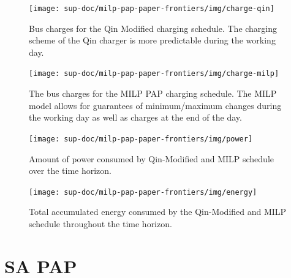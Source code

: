 \documentclass[ee,thesis]{usuthesis}
\begin{document}
\begin{subfigures}
    \begin{figure}[htpb]
    \centering
        \texttt{[image: sup-doc/milp-pap-paper-frontiers/img/charge-qin]}
        \caption{Bus charges for the Qin Modified charging schedule. The charging scheme of the Qin charger is more predictable during the working day.}
        \label{subfig:qin-charge}
    \end{figure}

    \hfill

    \begin{figure}[htpb]
    \centering
        \texttt{[image: sup-doc/milp-pap-paper-frontiers/img/charge-milp]}
        \caption{The bus charges for the MILP PAP charging schedule. The MILP model allows for guarantees of minimum/maximum changes during the working day as well as charges at the end of the day.}
        \label{subfig:milp-charge}
    \end{figure}
\end{subfigures}

\begin{figure}[htpb]
\centering
    \texttt{[image: sup-doc/milp-pap-paper-frontiers/img/power]}
    \caption{Amount of power consumed by Qin-Modified and MILP schedule over the time horizon.}
    \label{fig:power-usage}
\end{figure}

\begin{figure}[htpb]
\centering
    \texttt{[image: sup-doc/milp-pap-paper-frontiers/img/energy]}
    \caption{Total accumulated energy consumed by the Qin-Modified and MILP schedule throughout the time horizon.}
    \label{fig:energy-usage}
\end{figure}

\chapter{SA PAP}
\label{sec:sa-pap}
\end{document}
